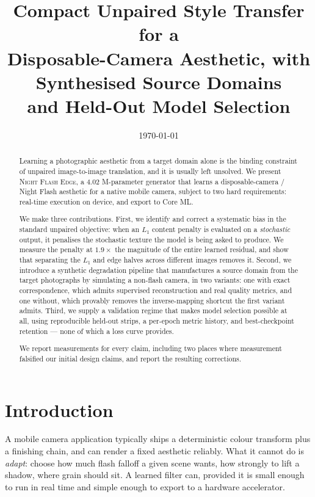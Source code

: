 \documentclass[11pt,a4paper]{article}
\title{\vspace{-2.2cm}\textbf{Compact Unpaired Style Transfer for a}\\
\large Disposable-Camera Aesthetic, with Synthesised Source Domains\\[6pt]
\large and Held-Out Model Selection}
\author{}
\date{\today}
\newcommand{\method}{\textsc{Night Flash Edge}}
\begin{document}
\maketitle
\vspace{-1.1cm}

\begin{abstract}
\noindent
Learning a photographic aesthetic from a target domain alone is the binding
constraint of unpaired image-to-image translation, and it is usually left
unsolved. We present \method, a $4.02$ M-parameter generator that learns a
disposable-camera / Night Flash aesthetic for a native mobile camera, subject to
two hard requirements: real-time execution on device, and export to Core ML.

We make three contributions. First, we identify and correct a systematic bias in
the standard unpaired objective: when an $L_1$ content penalty is evaluated on a
\emph{stochastic} output, it penalises the stochastic texture the model is being
asked to produce. We measure the penalty at $1.9\times$ the magnitude of the
entire learned residual, and show that separating the $L_1$ and edge halves across
different images removes it. Second, we introduce a synthetic degradation pipeline
that manufactures a source domain from the target photographs by simulating a
non-flash camera, in two variants: one with exact correspondence, which admits
supervised reconstruction and real quality metrics, and one without, which
provably removes the inverse-mapping shortcut the first variant admits. Third, we
supply a validation regime that makes model selection possible at all, using
reproducible held-out strips, a per-epoch metric history, and best-checkpoint
retention --- none of which a loss curve provides.

We report measurements for every claim, including two places where measurement
falsified our initial design claims, and report the resulting corrections.
\end{abstract}

\tableofcontents
\newpage

\section{Introduction}

A mobile camera application typically ships a deterministic colour transform
plus a finishing chain, and can render a fixed aesthetic reliably. What it cannot
do is \emph{adapt}: choose how much flash falloff a given scene wants, how
strongly to lift a shadow, where grain should sit. A learned filter can, provided
it is small enough to run in real time and simple enough to export to a hardware
accelerator.
\end{document}
